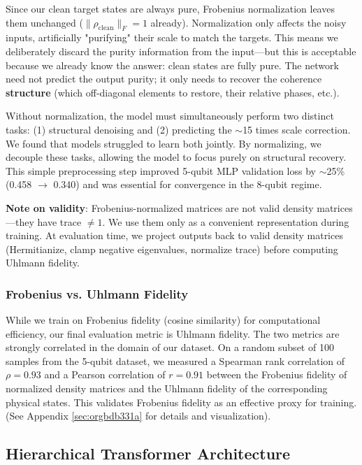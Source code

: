 \documentclass[11pt]{article}
\begin{document}
Since our clean target states are always pure, Frobenius normalization leaves them unchanged (\(\|\rho_{\text{clean}}\|_F = 1\) already). Normalization only affects the noisy inputs, artificially "purifying" their scale to match the targets. This means we deliberately discard the purity information from the input---but this is acceptable because we already know the answer: clean states are fully pure. The network need not predict the output purity; it only needs to recover the coherence \textbf{structure} (which off-diagonal elements to restore, their relative phases, etc.).

Without normalization, the model must simultaneously perform two distinct tasks: (1) structural denoising and (2) predicting the \(\sim\)15 times scale correction. We found that models struggled to learn both jointly. By normalizing, we decouple these tasks, allowing the model to focus purely on structural recovery. This simple preprocessing step improved 5-qubit MLP validation loss by \(\sim\)25\% (0.458 \(\to\) 0.340) and was essential for convergence in the 8-qubit regime.

\textbf{Note on validity}: Frobenius-normalized matrices are not valid density matrices---they have trace \(\neq 1\). We use them only as a convenient representation during training. At evaluation time, we project outputs back to valid density matrices (Hermitianize, clamp negative eigenvalues, normalize trace) before computing Uhlmann fidelity.
\subsubsection{Frobenius vs. Uhlmann Fidelity}
\label{sec:orge6f0414}

While we train on Frobenius fidelity (cosine similarity) for computational efficiency, our final evaluation metric is Uhlmann fidelity. The two metrics are strongly correlated in the domain of our dataset. On a random subset of 100 samples from the 5-qubit dataset, we measured a Spearman rank correlation of \(\rho = 0.93\) and a Pearson correlation of \(r = 0.91\) between the Frobenius fidelity of normalized density matrices and the Uhlmann fidelity of the corresponding physical states. This validates Frobenius fidelity as an effective proxy for training. (See Appendix \ref{sec:orgbdb331a} for details and visualization).
\subsection{Hierarchical Transformer Architecture}
\label{sec:org067d999}
\end{document}
